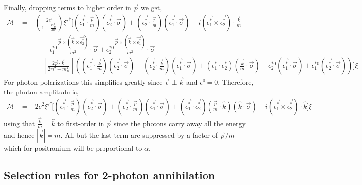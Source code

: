 \documentclass[12pt]{article}
\newcommand{\cM}{\mathcal{M}}
\begin{document}
Finally, dropping terms to higher order in $\vec{p}$ we get,
\begin{align*}
\cM & = - \left( \frac{2 e^2}{1 - \frac{m_B^2}{2 m^2}} \right) \xi'^{\dagger} \bigg[ (\vec{\epsilon_1^*} \cdot \tfrac{\vec{p}}{m}) (\vec{\epsilon^*_2} \cdot \vec{\sigma}) + (\vec{\epsilon_2^*} \cdot \tfrac{\vec{p}}{m}) (\vec{\epsilon^*_1} \cdot \vec{\sigma}) - i (\vec{\epsilon^*_1} \times \vec{\epsilon^*_2}) \cdot \tfrac{\vec{k}}{m} 
\\
& \quad \quad \quad - \epsilon_1^{*0} \frac{\vec{p} \times (\vec{k}  \times \vec{\epsilon_2^*})}{m^2} \cdot \vec{\sigma} +  \epsilon_2^{*0} \frac{\vec{p} \times (\vec{k} \times \vec{\epsilon_1^*})}{m^2} \cdot \vec{\sigma}
\\
& \quad \quad - \left[ \frac{2 \vec{p} \cdot \vec{k}}{2 m^2 - m_B^2}  \right]  \left( (\vec{\epsilon_1^*} \cdot \tfrac{\vec{k}}{m}) (\vec{\epsilon^*_2} \cdot \vec{\sigma}) + (\vec{\epsilon_2^*} \cdot \tfrac{\vec{k}}{m}) (\vec{\epsilon^*_1} \cdot \vec{\sigma}) + (\epsilon_1^* \cdot \epsilon_2^*) (\tfrac{\vec{k}}{m} \cdot \vec{\sigma}) - \epsilon_2^{*0} (\vec{\epsilon_1^*} \cdot \vec{\sigma}) + \epsilon_1^{*0} (\vec{\epsilon_2^*} \cdot \vec{\sigma}) \right) \bigg] \xi
\end{align*}
For photon polarizations this simplifies greatly since $\vec{\epsilon} \perp \vec{k}$ and $\epsilon^0 = 0$. Therefore, the photon amplitude is,
\begin{align*}
\cM & = -2 e^2 \xi'^{\dagger} \bigg[ (\vec{\epsilon_1^*} \cdot \tfrac{\vec{p}}{m}) (\vec{\epsilon^*_2} \cdot \vec{\sigma}) + (\vec{\epsilon_2^*} \cdot \tfrac{\vec{p}}{m}) (\vec{\epsilon^*_1} \cdot \vec{\sigma}) + (\vec{\epsilon_1^*} \cdot \vec{\epsilon_2^*})(\tfrac{\vec{p}}{m} \cdot \hat{k})(\hat{k} \cdot \vec{\sigma}) - i (\vec{\epsilon^*_1} \times \vec{\epsilon^*_2}) \cdot \hat{k} \bigg] \xi
\end{align*}
using that $\frac{\vec{k}}{m} = \hat{k}$ to first-order in $\vec{p}$ since the photons carry away all the energy and hence $|\vec{k}| = m$. All but the last term are suppressed by a factor of $\vec{p}/m$ which for positronium will be proportional to $\alpha$.

\subsection{Selection rules for 2-photon annihilation}
\end{document}
